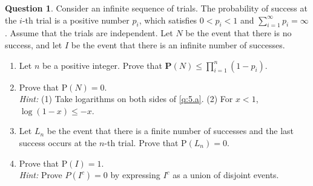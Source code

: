 \documentclass[utf8]{article}
\theoremstyle{definition}%
\newtheorem{question}{Question} %
\theoremstyle{plain}%
\begin{document}
\begin{question}
    Consider an infinite sequence of trials. The probability of success at the $i$-th trial is a positive number $p_i$, which satisfies $0 < p_i < 1$ and $\sum_{i=1}^\infty p_i = \infty$. Assume that the trials are independent. Let $N$ be the event that there is no success, and let $I$ be the event that there is an infinite number of successes.
    \begin{enumerate}[label=(\alph*)]
        \item \label{q:5.a} Let $n$ be a positive integer. Prove that $\mathbf{P}(N) \leq \prod_{i=1}^n (1-p_i)$.
        \item Prove that $\mathrm{P}(N) = 0$. \\
        \textit{Hint:} (1) Take logarithms on both sides of \ref{q:5.a}. (2) For $x < 1$, $\log(1-x) \leq -x$.
        \item Let $L_n$ be the event that there is a finite number of successes and the last success occurs at
        the $n$-th trial. Prove that $\mathrm{P}(L_n) = 0$.
        \item Prove that $\mathrm{P}(I) = 1$. \\
        \textit{Hint:} Prove $P(I^c) = 0$ by expressing $I^c$ as a union of disjoint events.
    \end{enumerate}
\end{question}
\end{document}
